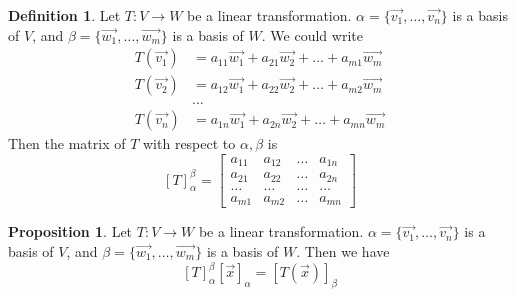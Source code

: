 \documentclass{article}
\theoremstyle{definition}
\newtheorem{proposition}[theorem]{Proposition}
\newtheorem{definition}[theorem]{Definition}
\theoremstyle{remark}
\begin{document}
\begin{definition}
    Let $T:V\rightarrow W$ be a linear transformation. $\alpha=\{\vec{v_1},\dots, \vec{v_n}\}$ is a basis of $V$, and $\beta = \{\vec{w_1},\dots, \vec{w_m}\}$ is a basis of $W$.
    We could write
    \[
    \begin{aligned}
        T(\vec{v_1})&= a_{11}\vec{w_1}+a_{21}\vec{w_2}+\dots+a_{m1}\vec{w_m}\\
        T(\vec{v_2})&= a_{12}\vec{w_1}+a_{22}\vec{w_2}+\dots+a_{m2}\vec{w_m}\\
        &\dots\\
        T(\vec{v_n})&= a_{1n}\vec{w_1}+a_{2n}\vec{w_2}+\dots+a_{mn}\vec{w_m}
    \end{aligned}
    \]
    Then the matrix of $T$ with respect to $\alpha, \beta$ is 
    \[
    [T]_{\alpha}^{\beta}=
    \begin{bmatrix}
    a_{11} & a_{12} & \dots & a_{1n} \\
    a_{21} & a_{22} & \dots & a_{2n} \\
    \dots & \dots & \dots & \dots\\
    a_{m1} & a_{m2} & \dots & a_{mn}
    \end{bmatrix}
    \]
\end{definition}

\begin{proposition}
    Let $T:V\rightarrow W$ be a linear transformation.
    $\alpha=\{\vec{v_1},\dots, \vec{v_n}\}$ is a basis of $V$, and $\beta = \{\vec{w_1},\dots, \vec{w_m}\}$ is a basis of $W$.
    Then we have
    \[
    [T]_{\alpha}^{\beta}[\vec{x}]_{\alpha}=[T(\vec{x})]_{\beta}
    \]
\end{proposition}
\end{document}
